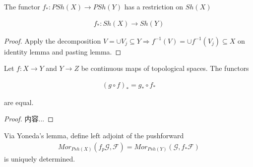 \documentclass[Total.tex]{subfiles}
\begin{document}
				\begin{corollary}
					The functor $f_*:PSh(X)\rightarrow PSh(Y)$ has a restriction on $Sh(X)$
					
					\begin{gather*}
						f_*:Sh(X)\rightarrow Sh(Y)
					\end{gather*}
				\end{corollary}
				
				\begin{proof}
					Apply the decomposition $V=\cup V_j\subseteq Y\Rightarrow f^{-1}(V)=\cup f^{-1}(V_j)\subseteq X$ on identity lemma and pasting lemma.
				\end{proof}
				\begin{lemma}
					Let $f:X\rightarrow Y$ and $Y\rightarrow Z$ be continuous maps of topological spaces. The functors
					
					\begin{gather*}
						(g\circ f)_*=g_*\circ f_*
					\end{gather*}
					
					are equal.
				\end{lemma}
				
				\begin{proof}
					内容...
				\end{proof}
				
				\begin{Def}
					Via Yoneda's lemma, define left adjoint of the pushforward
					\begin{gather*}
						Mor_{Psh(X)}(f_p \mathcal{G},\mathcal{F})=Mor_{Psh(Y)}(\mathcal{G},f_*\mathcal{F})
					\end{gather*} 
					is uniquely determined.
				\end{Def}
				
\end{document}
